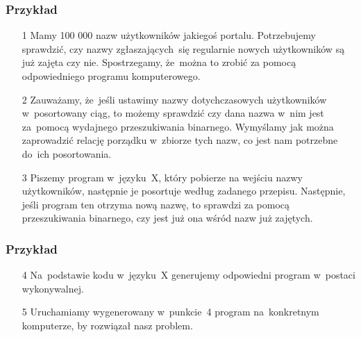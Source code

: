 \documentclass[10pt,t]{beamer}
\begin{document}
\begin{frame}
  \frametitle{Przykład}


  \begin{itemize}

  \item[1] Mamy 100 000 nazw użytkowników jakiegoś portalu. Potrzebujemy
    sprawdzić, czy nazwy zgłaszających~się regularnie nowych użytkowników
    są już zajęta czy nie. Spostrzegamy, że~można to zrobić za pomocą
    odpowiedniego programu komputerowego.

  \item[2] Zauważamy, że~jeśli ustawimy nazwy dotychczasowych użytkowników
    w~posortowany ciąg, to możemy sprawdzić czy dana nazwa w~nim jest
    za~pomocą wydajnego przeszukiwania binarnego. Wymyślamy jak można
    zaprowadzić relację porządku w~zbiorze tych nazw, co jest nam potrzebne
    do~ich posortowania.

  \item[3] Piszemy program w~języku~X, który pobierze na wejściu nazwy
    użytkowników, następnie je posortuje według zadanego przepisu.
    Następnie, jeśli program ten otrzyma nową nazwę, to sprawdzi za pomocą
    przeszukiwania binarnego, czy jest już ona wśród nazw już zajętych.

  \end{itemize}

\end{frame}





\begin{frame}
  \frametitle{Przykład}


  \begin{itemize}

  \item[4] Na~podstawie kodu w~języku~X generujemy odpowiedni program
    w~postaci wykonywalnej.

  \item[5] Uruchamiamy wygenerowany w~punkcie~4 program na~konkretnym
    komputerze, by rozwiązał nasz problem.

  \end{itemize}

\end{frame}
\end{document}
